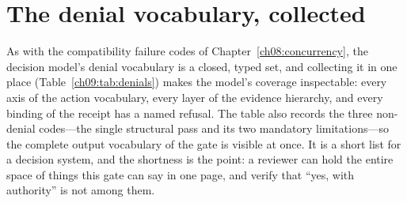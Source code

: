 \section{The denial vocabulary, collected}\label{ch09:denials}

As with the compatibility failure codes of Chapter~\ref{ch08:concurrency}, the decision model's denial vocabulary is a closed, typed set, and collecting it in one place (Table~\ref{ch09:tab:denials}) makes the model's coverage inspectable: every axis of the action vocabulary, every layer of the evidence hierarchy, and every binding of the receipt has a named refusal. The table also records the three non-denial codes---the single structural pass and its two mandatory limitations---so the complete output vocabulary of the gate is visible at once. It is a short list for a decision system, and the shortness is the point: a reviewer can hold the entire space of things this gate can say in one page, and verify that ``yes, with authority'' is not among them.

